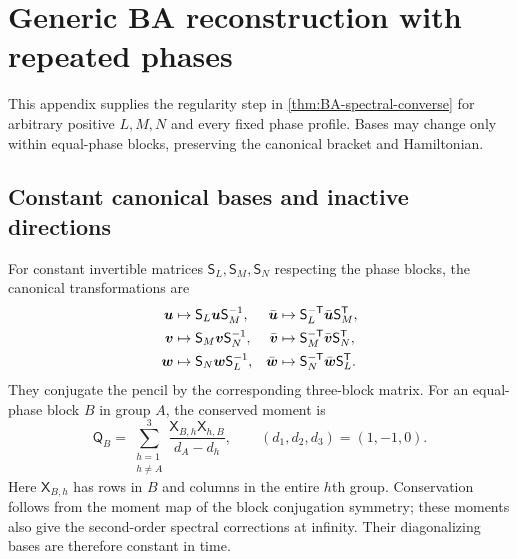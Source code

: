 \section{Generic BA reconstruction with repeated phases}
\label{app:BA-active-converse}

This appendix supplies the regularity step in
\cref{thm:BA-spectral-converse} for arbitrary positive $L,M,N$ and
every fixed phase profile. Bases may change only within equal-phase
blocks, preserving the canonical bracket and Hamiltonian.

\subsection{Constant canonical bases and inactive directions}

For constant invertible matrices $\mathsf S_L,\mathsf S_M,\mathsf S_N$
respecting the phase blocks, the canonical transformations are
\begin{equation}\label{eq:BA-block-bases}
\begin{aligned}
 \boldsymbol u&\mapsto\mathsf S_L\boldsymbol u\mathsf S_M^{-1},&
 \bar{\boldsymbol u}&\mapsto\mathsf S_L^{-\mathsf T}\bar{\boldsymbol u}\mathsf S_M^{\mathsf T},\\
 \boldsymbol v&\mapsto\mathsf S_M\boldsymbol v\mathsf S_N^{-1},&
 \bar{\boldsymbol v}&\mapsto\mathsf S_M^{-\mathsf T}\bar{\boldsymbol v}\mathsf S_N^{\mathsf T},\\
 \boldsymbol w&\mapsto\mathsf S_N\boldsymbol w\mathsf S_L^{-1},&
 \bar{\boldsymbol w}&\mapsto\mathsf S_N^{-\mathsf T}\bar{\boldsymbol w}\mathsf S_L^{\mathsf T}.
\end{aligned}
\end{equation}
They conjugate the pencil by the corresponding three-block matrix.
For an equal-phase block $B$ in group $A$, the conserved moment is
\[
 \mathsf Q_B=\sum_{\substack{h=1\\h\ne A}}^{3}
 \frac{\mathsf X_{B,h}\mathsf X_{h,B}}{d_A-d_h},\qquad
 (d_1,d_2,d_3)=(1,-1,0).
\]
Here $\mathsf X_{B,h}$ has rows in $B$ and columns in the entire
$h$th group. Conservation follows from the moment map of the block
conjugation symmetry; these moments also give the second-order
spectral corrections at infinity. Their diagonalizing bases are
therefore constant in time.

